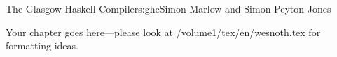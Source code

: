 \begin{aosachapter}{The Glasgow Haskell Compiler}{s:ghc}{Simon Marlow and Simon Peyton-Jones}

Your chapter goes here---please look at /volume1/tex/en/wesnoth.tex for 
formatting ideas.

\end{aosachapter}
